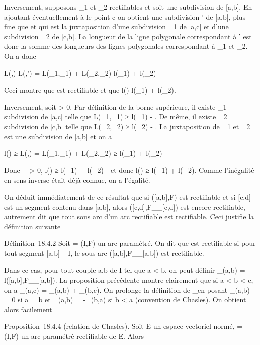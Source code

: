 \documentclass[]{article}
\begin{document}
Inversement, supposons \Gamma_1 et \Gamma_2 rectifiables et soit
\sigma une subdivision de [a,b]. En ajoutant éventuellement à \sigma le point
c on obtient une subdivision \sigma' de [a,b], plus fine que \sigma et qui est
la juxtaposition d'une subdivision \sigma_1 de [a,c] et d'une
subdivision \sigma_2 de [c,b]. La longueur de la ligne
polygonale correspondant à \sigma' est donc la somme des longueurs des lignes
polygonales correspondant à \sigma_1 et \sigma_2. On a donc

L(\Gamma,\sigma) \leq L(\Gamma,\sigma') = L(\Gamma_1,\sigma_1) +
L(\Gamma_2,\sigma_2) \leq l(\Gamma_1) + l(\Gamma_2)

Ceci montre que \Gamma est rectifiable et que l(\Gamma) \leq l(\Gamma_1) +
l(\Gamma_2).

Inversement, soit \epsilon > 0. Par définition de la borne
supérieure, il existe \sigma_1 subdivision de [a,c] telle que
L(\Gamma_1,\sigma_1) ≥ l(\Gamma_1) - \epsilon
{} . De même, il existe \sigma_2 subdivision
de [c,b] telle que L(\Gamma_2,\sigma_2) ≥ l(\Gamma_2)
- \epsilon {} . La juxtaposition \sigma de \sigma_1 et
\sigma_2 est une subdivision de [a,b] et on a

l(\Gamma) ≥ L(\Gamma,\sigma) = L(\Gamma_1,\sigma_1) +
L(\Gamma_2,\sigma_2) ≥ l(\Gamma_1) + l(\Gamma_2) - \epsilon

Donc \forall~~\epsilon > 0, l(\Gamma) ≥
l(\Gamma_1) + l(\Gamma_2) - \epsilon et donc l(\Gamma) ≥ l(\Gamma_1) +
l(\Gamma_2). Comme l'inégalité en sens inverse était déjà connue, on
a l'égalité.

On déduit immédiatement de ce résultat que si ([a,b],F) est
rectifiable et si [c,d] est un segment contenu dans [a,b], alors
([c,d],F__[c,d]) est encore
rectifiable, autrement dit que tout sous arc d'un arc rectifiable est
rectifiable. Ceci justifie la définition suivante

Définition~18.4.2 Soit \Gamma = (I,F) un arc paramétré. On dit que \Gamma est
rectifiable si pour tout segment [a,b] \subset~ I, le sous arc
([a,b],F__[a,b]) est rectifiable.

Dans ce cas, pour tout couple a,b de I tel que a < b, on peut
définir \ell_\Gamma(a,b) =
l([a,b],F__[a,b]). La proposition
précédente montre clairement que si a < b < c, on a
\ell_\Gamma(a,c) = \ell_\Gamma(a,b) + \ell_\Gamma(b,c). On prolonge
la définition de \ell_\Gamma en posant \ell_\Gamma(a,b) = 0 si a = b
et \ell_\Gamma(a,b) = -\ell_\Gamma(b,a) si b < a (convention
de Chasles). On obtient alors facilement

Proposition~18.4.4 (relation de Chasles). Soit E un espace vectoriel
normé, \Gamma = (I,F) un arc paramétré rectifiable de E. Alors
\end{document}
